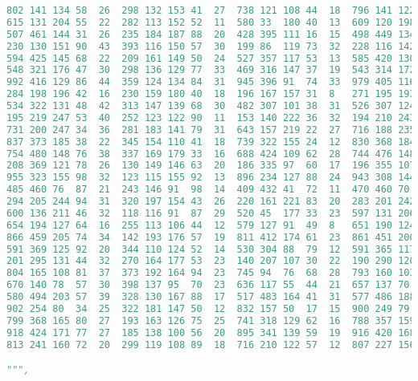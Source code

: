 \begin{lstlisting}[language=Python]
802	141	134	58	26	298	132	153	41	27	738	121	108	44	18	796	141	122	54	20
615	131	204	55	22	282	113	152	52	11	580	33	180	40	13	609	120	198	40	18
507	461	144	31	26	235	184	187	88	20	428	395	111	16	15	498	449	134	30	22
230	130	151	90	43	393	116	150	57	30	199	86	119	73	32	228	116	142	79	32
594	425	145	68	22	209	161	149	50	24	527	357	117	53	13	585	420	130	65	21
548	321	176	47	30	298	136	129	77	33	469	316	147	37	19	543	314	172	39	27
992	416	129	86	44	359	124	134	84	31	945	396	91	74	33	979	405	116	86	39
284	198	196	42	16	230	159	180	40	18	196	167	157	31	8	271	195	193	29	14
534	322	131	48	42	313	147	139	68	30	482	307	101	38	31	526	307	124	45	30
195	219	247	53	40	252	123	122	90	11	153	140	222	36	32	194	210	243	44	36
731	200	247	34	36	281	183	141	79	31	643	157	219	22	27	716	188	235	23	34
837	373	185	38	22	345	154	110	41	18	739	322	155	24	12	830	368	184	32	10
754	480	148	76	38	337	169	179	33	16	688	424	109	62	28	744	476	148	65	27
208	369	121	78	26	130	149	146	63	20	186	335	97	60	17	196	355	107	77	15
955	323	155	98	32	123	115	155	92	13	896	234	127	88	24	943	308	144	92	23
485	460	76	87	21	243	146	91	98	14	409	432	41	72	11	470	460	70	81	14
294	205	244	94	31	320	197	154	43	26	220	161	221	83	20	283	201	242	83	17
600	136	211	46	32	118	116	91	87	29	520	45	177	33	23	597	131	206	35	28
654	194	127	64	16	255	113	106	44	12	579	127	91	49	8	651	190	124	51	7
866	459	205	74	34	142	193	176	57	19	811	412	174	61	23	861	451	200	67	19
591	369	125	92	20	344	110	124	52	14	530	304	88	79	12	591	365	117	81	9
201	295	131	44	32	270	164	177	53	23	140	207	107	30	22	190	290	120	29	22
804	165	108	81	37	373	192	164	94	23	745	94	76	68	28	793	160	103	74	36
670	140	78	57	30	398	137	95	70	23	636	117	55	44	21	657	137	70	57	22
580	494	203	57	39	328	130	167	88	17	517	483	164	41	31	577	486	188	48	30
902	254	80	34	25	322	181	147	50	12	832	157	50	17	15	900	249	79	28	18
799	368	165	80	27	193	163	126	75	25	741	318	129	62	16	788	357	159	65	24
918	424	171	77	27	185	138	100	56	20	895	341	139	59	19	916	420	168	74	24
813	241	160	72	20	299	119	108	89	18	716	210	122	57	12	807	227	156	71	9

""",


\end{lstlisting}
